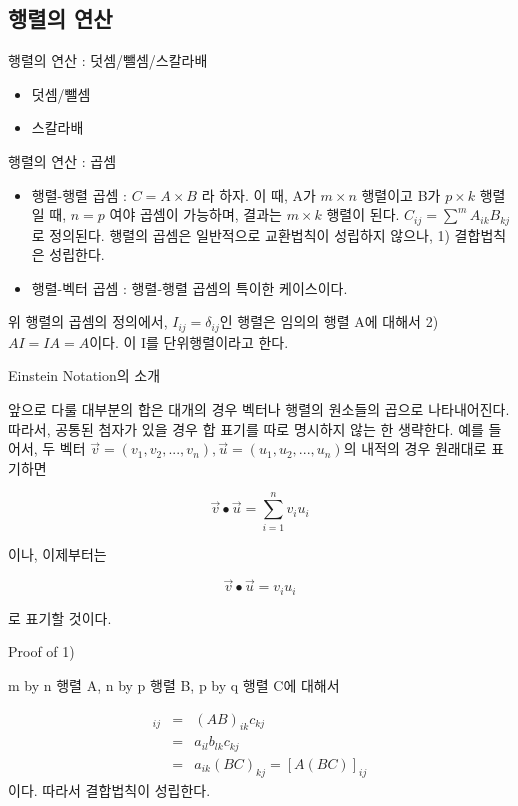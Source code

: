 \documentclass{beamer}
\begin{document}
\subsection{행렬의 연산}

\begin{frame}{행렬의 연산 : 덧셈/뺄셈/스칼라배} 
\begin{itemize} 
\item 덧셈/뺄셈 
\item 스칼라배
\end{itemize}
\end{frame}

\begin{frame}{행렬의 연산 : 곱셈} 
\begin{itemize} 
\item 행렬-행렬 곱셈 : $C = A\times B$ 라 하자. 이 때, A가 $m \times n$ 행렬이고 B가 $p \times k$ 행렬일 때, $n=p$ 여야 곱셈이 가능하며, 결과는 $m \times k$ 행렬이 된다. $C_{ij} = \sum^m A_{ik} B_{kj}$ 로 정의된다. 행렬의 곱셈은 일반적으로 교환법칙이 성립하지 않으나, 1) 결합법칙은 성립한다. 
\item 행렬-벡터 곱셈 : 행렬-행렬 곱셈의 특이한 케이스이다. 
\end{itemize}

위 행렬의 곱셈의 정의에서, $I_{ij} = \delta_{ij}$인 행렬은 임의의 행렬 A에 대해서 2) $AI = IA = A$이다. 이 I를 단위행렬이라고 한다. 
\end{frame}

\begin{frame}{Einstein Notation의 소개} 

앞으로 다룰 대부분의 합은 대개의 경우 벡터나 행렬의 원소들의 곱으로 나타내어진다. 따라서, 공통된 첨자가 있을 경우 합 표기를 따로 명시하지 않는 한 생략한다. 예를 들어서, 두 벡터 $\vec{v} = (v_1, v_2, ..., v_n), \vec{u} = (u_1, u_2, ..., u_n)$의 내적의 경우 원래대로 표기하면 

\begin{equation} 
\vec{v} \bullet \vec{u} = \sum^{n}_{i=1} v_i u_i 
\end{equation}

이나, 이제부터는 

\begin{equation} 
\vec{v} \bullet \vec{u} =  v_i u_i 
\end{equation}

로 표기할 것이다.

\end{frame}

\begin{frame}{Proof of 1)} 

m by n 행렬 A, n by p 행렬 B, p by q 행렬 C에 대해서 

\begin{eqnarray} 
[(AB)C]_{ij} & = & (AB)_{ik} c_{kj} \\
& = & a_{il}b_{lk}c_{kj}  \\
& = & a_{ik} (BC)_{kj}  = [A(BC)]_{ij}
\end{eqnarray}
이다. 따라서 결합법칙이 성립한다. 
\end{frame}
\end{document}

